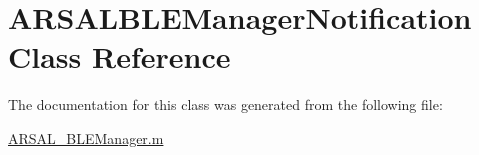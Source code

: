 \hypertarget{classARSALBLEManagerNotification}{}\section{A\+R\+S\+A\+L\+B\+L\+E\+Manager\+Notification Class Reference}
\label{classARSALBLEManagerNotification}


The documentation for this class was generated from the following file\+:\begin{DoxyCompactItemize}
\item 
\hyperlink{ARSAL__BLEManager_8m}{A\+R\+S\+A\+L\+\_\+\+B\+L\+E\+Manager.\+m}\end{DoxyCompactItemize}
